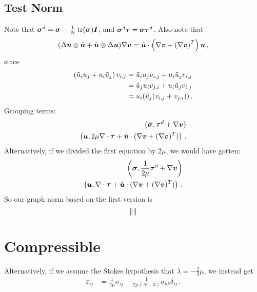 \documentclass{article}
\begin{document}
\subsection*{Test Norm}
Note that $\boldsymbol\sigma^d=\boldsymbol\sigma-\frac{1}{N}\operatorname*{tr}(\boldsymbol\sigma)\boldsymbol I$, and $\boldsymbol\sigma^d\boldsymbol\tau=\boldsymbol\sigma\boldsymbol\tau^d$.
Also note that 
\[
(\Delta\boldsymbol u\otimes\tilde{\boldsymbol u}+\tilde{\boldsymbol u}\otimes\Delta\boldsymbol u)\nabla\boldsymbol v=\tilde{\boldsymbol u}\cdot\left( \nabla\boldsymbol v+\left( \nabla\boldsymbol v \right)^T \right)\boldsymbol u\,,
\]
since
\begin{align*}
  \left( \tilde u_i u_j+u_i\tilde u_j \right)v_{i,j}&=\tilde u_i u_j v_{i,j}+u_i \tilde u_j v_{i,j}\\
  &=\tilde u_j u_i v_{j,i}+u_i \tilde u_j v_{i,j}\\
  &=u_i(\tilde u_j(v_{i,j}+v_{j,i}))\,.
\end{align*}
Grouping terms:
\begin{align*}
\left( \boldsymbol\sigma,\boldsymbol\tau^d+\nabla\boldsymbol v \right)\\
\left( \boldsymbol u,2\mu\nabla\cdot\boldsymbol\tau+\tilde{\boldsymbol u}\cdot(\nabla\boldsymbol v+(\nabla\boldsymbol v)^T) \right)\,.
\end{align*}
Alternatively, if we divided the first equation by $2\mu$, we would have gotten:
\begin{align*}
\left( \boldsymbol\sigma,\frac{1}{2\mu}\boldsymbol\tau^d+\nabla\boldsymbol v \right)\\
\left( \boldsymbol u,\nabla\cdot\boldsymbol\tau+\tilde{\boldsymbol u}\cdot(\nabla\boldsymbol v+(\nabla\boldsymbol v)^T) \right)\,.
\end{align*}
So our graph norm based on the first version is
\begin{equation*}
\left\|  \right\|
\end{equation*}

\section*{Compressible}
Alternatively, if we assume the Stokes hypothesis that $\lambda=-\frac{2}{3}\mu$, we instead get
\begin{align*}
  \varepsilon_{ij}&=\frac{1}{2\mu}\sigma_{ij}-\frac{1}{2\mu(N-3)}\sigma_{kk}\delta_{ij}\,.
\end{align*}
\end{document}
